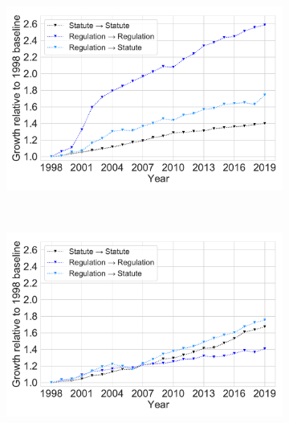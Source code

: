 \documentclass[varwidth, border=0pt]{standalone}
\begin{document}
	
	\begin{figure}
	\centering
\begin{subfigure}{0.5\linewidth}
	\centering
	\includegraphics[width=\linewidth]{../../graphics/reference-statistics-comparison-us.pdf}%
\end{subfigure}~%
\begin{subfigure}{0.5\linewidth}
	\includegraphics[width=\linewidth]{../../graphics/reference-statistics-comparison-de.pdf}%
\end{subfigure}
	\end{figure}
	
\end{document}
